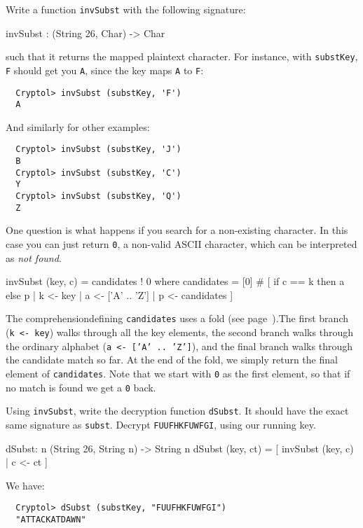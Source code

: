 \begin{Exercise}\label{ex:subst:1}
Write a function {\tt invSubst} with the following signature:
\begin{code}
  invSubst : (String 26, Char) -> Char
\end{code}
such that it returns the mapped plaintext character. For instance,
with {\tt substKey}, {\tt F} should get you {\tt A}, since the key
maps {\tt A} to {\tt F}:
\begin{Verbatim}
  Cryptol> invSubst (substKey, 'F')
  A
\end{Verbatim}
And similarly for other examples:
\begin{Verbatim}
  Cryptol> invSubst (substKey, 'J')
  B
  Cryptol> invSubst (substKey, 'C')
  Y
  Cryptol> invSubst (substKey, 'Q')
  Z
\end{Verbatim}
One question is what happens if you search for a non-existing
character.  In this case you can just return {\tt 0}, a non-valid
ASCII character, which can be interpreted as {\em not found}.
\indFold
\end{Exercise}
\begin{Answer}
\begin{code}
  invSubst (key, c) = candidates ! 0
    where candidates = [0] # [ if c == k then a else p
                             | k <- key
                             | a <- ['A' .. 'Z']
                             | p <- candidates
                             ]
\end{code}
The comprehension\indComp defining {\tt candidates} uses a fold (see
page~\pageref{par:fold}).\indFold The first branch ({\tt k <- key})
walks through all the key elements, the second branch walks through
the ordinary alphabet ({\tt a <- ['A' .. 'Z']}), and the final branch
walks through the candidate match so far. At the end of the fold, we
simply return the final element of {\tt candidates}. Note that we
start with {\tt 0} as the first element, so that if no match is found
we get a {\tt 0} back.
\end{Answer}

\begin{Exercise}\label{ex:subst:2}
  Using {\tt invSubst}, write the decryption function {\tt dSubst}.
  It should have the exact same signature as {\tt subst}.  Decrypt
  {\tt FUUFHKFUWFGI}, using our running key.
\end{Exercise}
\begin{Answer}
\begin{code}
  dSubst: {n} (String 26, String n) -> String n
  dSubst (key, ct) = [ invSubst (key, c) | c <- ct ]
\end{code}
We have:
\begin{Verbatim}
  Cryptol> dSubst (substKey, "FUUFHKFUWFGI")
  "ATTACKATDAWN"
\end{Verbatim}
\end{Answer}

